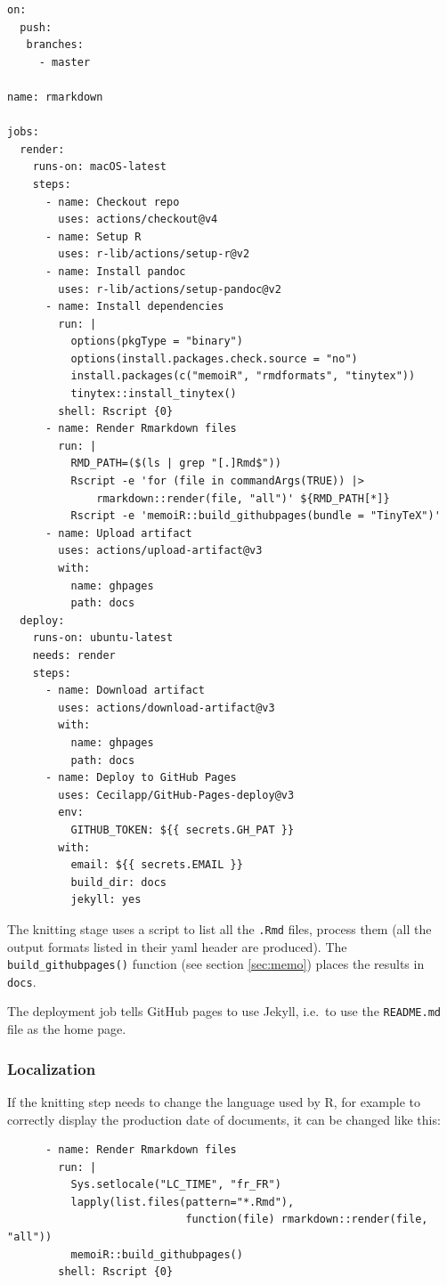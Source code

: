 \documentclass[
  12pt,
  american,
  a4paper,
  extrafontsizes,onecolumn,openright
  ]{memoir}
\begin{document}
\begin{verbatim}
on:
  push:
   branches:
     - master

name: rmarkdown

jobs:
  render:
    runs-on: macOS-latest
    steps:
      - name: Checkout repo
        uses: actions/checkout@v4
      - name: Setup R
        uses: r-lib/actions/setup-r@v2
      - name: Install pandoc
        uses: r-lib/actions/setup-pandoc@v2
      - name: Install dependencies
        run: |
          options(pkgType = "binary")
          options(install.packages.check.source = "no")
          install.packages(c("memoiR", "rmdformats", "tinytex"))
          tinytex::install_tinytex()
        shell: Rscript {0}
      - name: Render Rmarkdown files
        run: |
          RMD_PATH=($(ls | grep "[.]Rmd$"))
          Rscript -e 'for (file in commandArgs(TRUE)) |>
              rmarkdown::render(file, "all")' ${RMD_PATH[*]}
          Rscript -e 'memoiR::build_githubpages(bundle = "TinyTeX")'
      - name: Upload artifact
        uses: actions/upload-artifact@v3
        with:
          name: ghpages
          path: docs
  deploy:
    runs-on: ubuntu-latest
    needs: render
    steps:
      - name: Download artifact
        uses: actions/download-artifact@v3
        with:
          name: ghpages
          path: docs
      - name: Deploy to GitHub Pages
        uses: Cecilapp/GitHub-Pages-deploy@v3
        env:
          GITHUB_TOKEN: ${{ secrets.GH_PAT }}
        with:
          email: ${{ secrets.EMAIL }}
          build_dir: docs
          jekyll: yes
\end{verbatim}

The knitting stage uses a script to list all the \texttt{.Rmd} files, process them (all the output formats listed in their yaml header are produced).
The \texttt{build\_githubpages()} function (see section \ref{sec:memo}) places the results in \texttt{docs}.

The deployment job tells GitHub pages to use Jekyll, i.e.~to use the \texttt{README.md} file as the home page.

\subsubsection{Localization}\label{localization}

If the knitting step needs to change the language used by R, for example to correctly display the production date of documents, it can be changed like this:

\begin{verbatim}
      - name: Render Rmarkdown files
        run: |
          Sys.setlocale("LC_TIME", "fr_FR")
          lapply(list.files(pattern="*.Rmd"), 
                            function(file) rmarkdown::render(file, "all"))
          memoiR::build_githubpages()
        shell: Rscript {0}
\end{verbatim}
\end{document}
